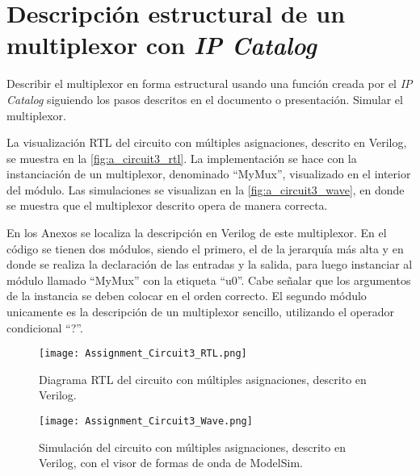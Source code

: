 \section{Descripción estructural de un multiplexor con \textit{IP Catalog} \label{sec:s2}}

\begin{center}
	\begin{minipage}{12cm}
		\begin{tcolorbox}[title=Actividad 2]
			Describir el multiplexor en forma estructural usando una función creada por el \textit{IP Catalog} siguiendo los pasos descritos en el documento o presentación. Simular el multiplexor.
		\end{tcolorbox}	
	\end{minipage}
\end{center}

La visualización RTL del circuito con múltiples asignaciones, descrito en Verilog, se muestra en la \autoref{fig:a_circuit3_rtl}. La implementación se hace con la instanciación de un multiplexor, denominado ``MyMux'', visualizado en el interior del módulo. Las simulaciones se visualizan en la \autoref{fig:a_circuit3_wave}, en donde se muestra que el multiplexor descrito opera de manera correcta.

En los Anexos se localiza la descripción en Verilog de este multiplexor. En el código se tienen dos módulos, siendo el primero, el de la jerarquía más alta y en donde se realiza la declaración de las entradas y la salida, para luego instanciar al módulo llamado ``MyMux'' con la etiqueta ``u0''. Cabe señalar que los argumentos de la instancia se deben colocar en el orden correcto. El segundo módulo unicamente es la descripción de un multiplexor sencillo, utilizando el operador condicional ``?''.

\begin{figure}[ht]
	\centering
	\texttt{[image: Assignment\_Circuit3\_RTL.png]}
	\caption{Diagrama RTL del circuito con múltiples asignaciones, descrito en Verilog. \label{fig:a_circuit3_rtl}}
\end{figure}

\begin{figure}[ht]
	\centering
	\texttt{[image: Assignment\_Circuit3\_Wave.png]}
	\caption{Simulación del circuito con múltiples asignaciones, descrito en Verilog, con el visor de formas de onda de ModelSim. \label{fig:a_circuit3_wave}}
\end{figure}